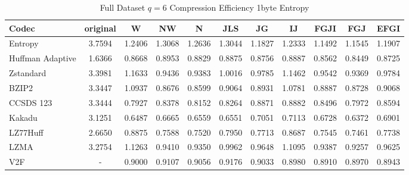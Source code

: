 \documentclass{article}
\begin{document}
\begin{table}[h!]
\centering
\caption{Full Dataset $q=6$ Compression Efficiency 1byte Entropy}
\begin{tabular}{|l|cccccccccc|}
\hline
Codec &  original &      W &     NW &      N &    JLS &     JG &     IJ &   FGJI &    FGJ &   EFGI \\
\hline
Entropy & 3.7594 & 1.2406 & 1.3068 & 1.2636 & 1.3044 & 1.1827 & 1.2333 & 1.1492 & 1.1545 & 1.1907 \\
\hline
Huffman Adaptive &    1.6366 & 0.8668 & 0.8953 & 0.8829 & 0.8875 & 0.8756 & 0.8887 & 0.8562 & 0.8449 & 0.8725 \\
Zstandard        &    3.3981 & 1.1633 & 0.9436 & 0.9383 & 1.0016 & 0.9785 & 1.1462 & 0.9542 & 0.9369 & 0.9784 \\
BZIP2            &    3.3447 & 1.0937 & 0.8676 & 0.8599 & 0.9064 & 0.8931 & 1.0781 & 0.8887 & 0.8728 & 0.9068 \\
CCSDS 123        &    3.3444 & 0.7927 & 0.8378 & 0.8152 & 0.8264 & 0.8871 & 0.8882 & 0.8496 & 0.7972 & 0.8594 \\
Kakadu           &    3.1251 & 0.6487 & 0.6665 & 0.6559 & 0.6551 & 0.7051 & 0.7113 & 0.6728 & 0.6372 & 0.6901 \\
LZ77Huff         &    2.6650 & 0.8875 & 0.7588 & 0.7520 & 0.7950 & 0.7713 & 0.8687 & 0.7545 & 0.7461 & 0.7738 \\
LZMA             &    3.2754 & 1.1263 & 0.9410 & 0.9350 & 0.9962 & 0.9648 & 1.1095 & 0.9387 & 0.9257 & 0.9625 \\
V2F              &    - & 0.9000 & 0.9107 & 0.9056 & 0.9176 & 0.9033 & 0.8980 & 0.8910 & 0.8970 & 0.8943 \\
\hline
\end{tabular}
\end{table}
\end{document}
